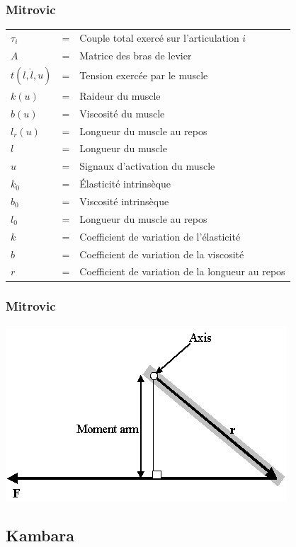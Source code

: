 \documentclass{beamer}
\begin{document}
\begin{frame}
\frametitle{Mitrovic}
\begin{tabular}{lcl}
    $\tau_i$ & = & Couple total exercé sur l'articulation $i$ \\
    $A$  & = & Matrice des bras de levier \\
    $t(l, \dot{l}, u)$  & = & Tension exercée par le muscle \\
    $k(u)$ & = & Raideur du muscle \\
    $b(u)$ & = & Viscosité du muscle \\
    $l_r(u)$ & = & Longueur du muscle au repos \\
    $l$ & = & Longueur du muscle \\
    $u$ & = & Signaux d'activation du muscle \\
    $k_0$ & = & Élasticité intrinsèque \\
    $b_0$ & = & Viscosité intrinsèque \\
    $l_0$ & = & Longueur du muscle au repos \\
    $k$ & = & Coefficient de variation de l'élasticité \\
    $b$ & = & Coefficient de variation de la viscosité \\
    $r$ & = & Coefficient de variation de la longueur au repos \\
\end{tabular}
\end{frame}

\begin{frame}
\frametitle{Mitrovic}
\begin{center}
        \includegraphics[width=.50\linewidth]{fig/moment_arm}
\end{center}
\end{frame}


\subsection{Kambara}
\end{document}

